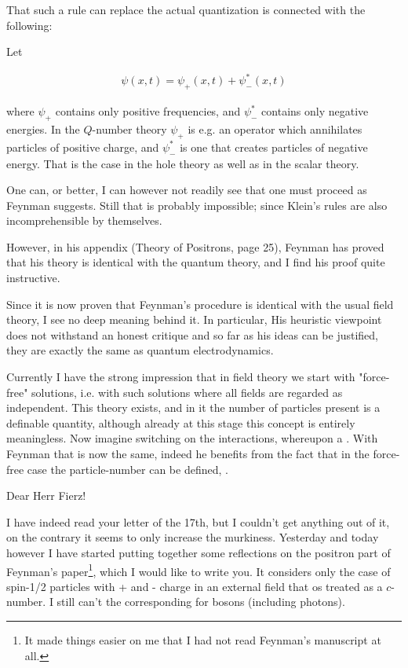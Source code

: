 \documentclass{article}
\newcommand{\uequ}[1]{
\begin{align*}
#1
\end{align*}
}
\begin{document}
That such a rule can replace the actual quantization is connected with the following:

Let
\uequ{
\psi(x,t) = \psi_{+}(x,t) + \psi^*_{-}(x,t)
}
where $\psi_{+}$ contains only positive frequencies, and $\psi^*_{-}$ contains only negative energies. In the $Q$-number theory $\psi_{+}$ is e.g. an operator which annihilates particles of positive charge, and $\psi^*_{-}$ is one that creates particles of negative energy. That is the case in the hole theory as well as in the scalar theory. 

One can, or better, I can however not readily see that one must proceed as Feynman suggests. Still that is probably impossible; since Klein's rules are also incomprehensible by themselves.

However, in his appendix (Theory of Positrons, page 25), Feynman has proved that his theory is identical with the quantum theory, and I find his proof quite instructive.

Since it is now proven that Feynman's procedure is identical with the usual field theory, I see no deep meaning behind it. In particular,  His heuristic viewpoint does not withstand an honest critique and so far as his ideas can be justified, they are exactly the same as quantum electrodynamics.

Currently I have the strong impression  that in field theory we start with "force-free" solutions, i.e. with such solutions where all fields are regarded as independent. This theory exists, and in it the number of particles present is a definable quantity, although already at this stage this concept is entirely meaningless. Now imagine switching on the interactions, whereupon a . With Feynman that is now the same, indeed he benefits from the fact that in the force-free case the particle-number can be defined, .

\date{June 21, 1949}
\tags{}

Dear Herr Fierz!

I have indeed read your letter of the 17th, but I couldn't get anything out of it, on the contrary it seems to only increase the murkiness. Yesterday and today however I have started putting together some reflections on the positron part of Feynman's paper\footnote{It made things easier on me that I had not read Feynman's manuscript at all.}, which I would like to write you. It considers only the case of spin-1/2 particles with + and - charge in an external field that os treated as a $c$-number. I still can't  the corresponding for bosons (including photons).
\end{document}

